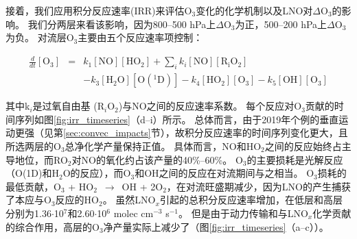 接着，我们应用积分反应速率(IRR)来评估O$_3$变化的化学机制以及LNO对$\Delta$O$_3$的影响。
我们分两层来看该影响，因为800--500 hPa上$\Delta$O$_3$为正，500--200 hPa上$\Delta$O$_3$为负。
对流层O$_3$主要由五个反应速率项控制\citep{Pickering.1990}：

\begin{eqnarray}
  \frac{d}{dt}[\mathrm{O_3}] & = & k_1[\mathrm{NO}][\mathrm{HO_2}] + \sum_{i}  k_i[\mathrm{NO}][\mathrm{R_iO_2}] \nonumber \\
                             && - k_3[\mathrm{H_2O}][\mathrm{O(^1D)}] - k_4[\mathrm{HO_2}][\mathrm{O_3}] - k_5[\mathrm{OH}][\mathrm{O_3}]
\end{eqnarray}

其中k$_i$是过氧自由基 (R$_i$O$_2$)与NO之间的反应速率系数。
每个反应对O$_3$贡献的时间序列如图\ref{fig:irr_timeseries}（d--i）所示。
总体而言，由于2019年个例的垂直运动更强（见第\ref{sec:convec_impacts}节），故积分反应速率的时间序列变化更大，且所选两层的O$_3$总净化学产量保持正值。
具体而言，NO和HO$_2$之间的反应始终占主导地位，而RO$_2$对NO的氧化约占该产量的40\%--60\%。
O$_3$的主要损耗是光解反应（O(1D)和H$_2$O的反应），而O$_3$和OH之间的反应在对流期间与之相当。
O$_3$损耗的最低贡献，O$_3$ + HO$_2$ $\,\to\,$ OH + 2O$_2$，在对流旺盛期减少，因为LNO的产生捕获了本应与O$_3$反应的HO$_2$。
虽然LNO$_x$引起的总积分反应速率增加，在低层和高层分别为1.36$\cdot$10$^7$和2.60$\cdot$10$^6$ molec cm$^{-3}$ s$^{-1}$。
但是由于动力传输和与LNO$_x$化学贡献的综合作用，高层的O$_3$净产量实际上减少了（图\ref{fig:irr_timeseries}（a--c））。


